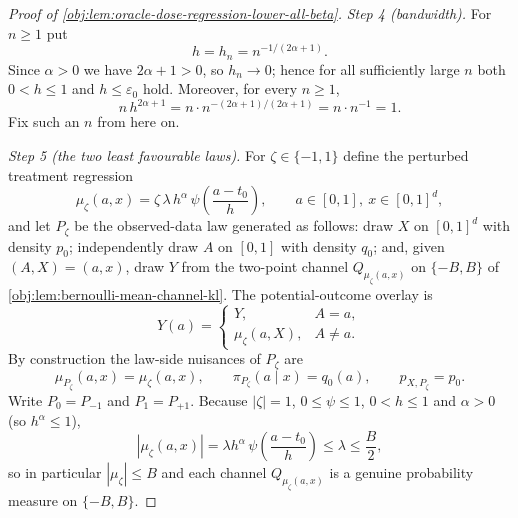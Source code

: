 \documentclass[11pt]{article}
\begin{document}
\begin{proof}[Proof of \cref{obj:lem:oracle-dose-regression-lower-all-beta}]
\emph{Step 4 (bandwidth).} For \(n\ge1\) put
\[
h=h_n=n^{-1/(2\alpha+1)} .
\]
Since \(\alpha>0\) we have \(2\alpha+1>0\), so \(h_n\to 0\); hence for all sufficiently large \(n\)
both \(0<h\le 1\) and \(h\le\varepsilon_0\) hold. Moreover, for every \(n\ge1\),
\[
n\,h^{2\alpha+1}
=
n\cdot n^{-(2\alpha+1)/(2\alpha+1)}
=
n\cdot n^{-1}
=
1 .
\]
Fix such an \(n\) from here on. %

\emph{Step 5 (the two least favourable laws).} For \(\zeta\in\{-1,1\}\) define the perturbed
treatment regression
\[
\mu_\zeta(a,x)
=
\zeta\,\lambda\,h^{\alpha}\,\psi\!\left(\frac{a-t_0}{h}\right),
\qquad a\in[0,1],\ x\in[0,1]^d,
\]
and let \(P_\zeta\) be the observed-data law generated as follows: draw \(X\) on \([0,1]^d\) with
density \(p_0\); independently draw \(A\) on \([0,1]\) with density \(q_0\); and, given
\((A,X)=(a,x)\), draw \(Y\) from the two-point channel \(Q_{\mu_\zeta(a,x)}\) on \(\{-B,B\}\) of
\cref{obj:lem:bernoulli-mean-channel-kl}. The potential-outcome overlay is
\[
Y(a)=
\begin{cases}
Y, & A=a,\\
\mu_\zeta(a,X), & A\ne a .
\end{cases}
\]
By construction the law-side nuisances of \(P_\zeta\) are
\[
\mu_{P_\zeta}(a,x)=\mu_\zeta(a,x),
\qquad
\pi_{P_\zeta}(a\mid x)=q_0(a),
\qquad
p_{X,P_\zeta}=p_0 .
\]
Write \(P_0=P_{-1}\) and \(P_1=P_{+1}\). Because \(|\zeta|=1\), \(0\le\psi\le1\), \(0<h\le1\) and
\(\alpha>0\) (so \(h^\alpha\le 1\)),
\[
|\mu_\zeta(a,x)|
=
\lambda h^{\alpha}\,\psi\!\left(\frac{a-t_0}{h}\right)
\le
\lambda
\le
\frac B2 ,
\]
so in particular \(|\mu_\zeta|\le B\) and each channel \(Q_{\mu_\zeta(a,x)}\) is a genuine
probability measure on \(\{-B,B\}\).


\end{proof}
\end{document}
